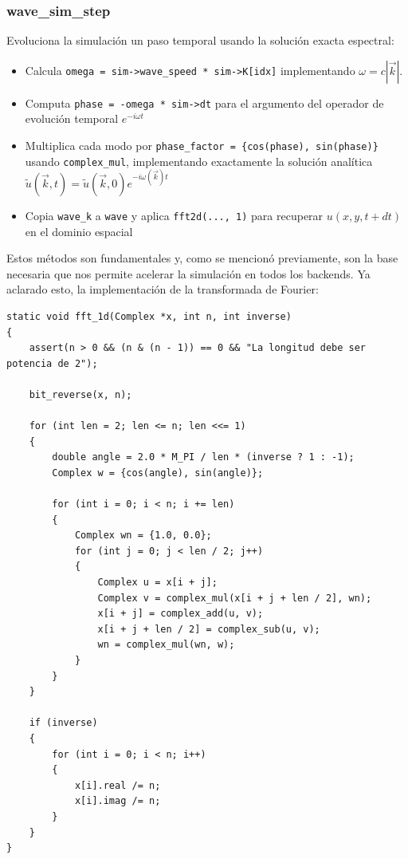 \documentclass[a4paper]{article}
\begin{document}
\subsubsection{wave\_sim\_step}

Evoluciona la simulación un paso temporal usando la solución exacta espectral:

\begin{itemize}
    \item Calcula \texttt{omega = sim->wave\_speed * sim->K[idx]} implementando $\omega = c|\vec{k}|$.
    \item Computa \texttt{phase = -omega * sim->dt} para el argumento del operador de evolución temporal $e^{-i\omega t}$
    \item Multiplica cada modo por \texttt{phase\_factor = \{cos(phase), sin(phase)\}} usando \texttt{complex\_mul}, implementando exactamente la solución analítica $\tilde{u}(\vec{k},t) = \tilde{u}(\vec{k},0) e^{-i\omega(\vec{k})t}$
    \item Copia \texttt{wave\_k} a \texttt{wave} y aplica \texttt{fft2d(..., 1)} para recuperar $u(x,y,t+dt)$ en el dominio espacial
\end{itemize}

Estos métodos son fundamentales y, como se mencionó previamente, son la base necesaria que nos permite acelerar la simulación en todos los backends. Ya aclarado esto, la implementación de la transformada de Fourier:

\begin{verbatim}
static void fft_1d(Complex *x, int n, int inverse)
{
    assert(n > 0 && (n & (n - 1)) == 0 && "La longitud debe ser potencia de 2");

    bit_reverse(x, n);

    for (int len = 2; len <= n; len <<= 1)
    {
        double angle = 2.0 * M_PI / len * (inverse ? 1 : -1);
        Complex w = {cos(angle), sin(angle)};

        for (int i = 0; i < n; i += len)
        {
            Complex wn = {1.0, 0.0};
            for (int j = 0; j < len / 2; j++)
            {
                Complex u = x[i + j];
                Complex v = complex_mul(x[i + j + len / 2], wn);
                x[i + j] = complex_add(u, v);
                x[i + j + len / 2] = complex_sub(u, v);
                wn = complex_mul(wn, w);
            }
        }
    }

    if (inverse)
    {
        for (int i = 0; i < n; i++)
        {
            x[i].real /= n;
            x[i].imag /= n;
        }
    }
}
\end{verbatim}
\end{document}
